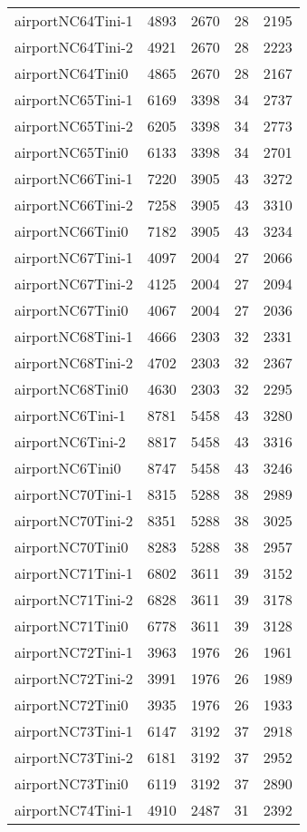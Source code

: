 \documentclass[../../../thesis.tex]{subfiles}
\begin{document}
\begin{longtable}{lrrrr}
airportNC64Tini-1 & 4893 & 2670 & 28 & 2195 \\
airportNC64Tini-2 & 4921 & 2670 & 28 & 2223 \\
airportNC64Tini0 & 4865 & 2670 & 28 & 2167 \\
airportNC65Tini-1 & 6169 & 3398 & 34 & 2737 \\
airportNC65Tini-2 & 6205 & 3398 & 34 & 2773 \\
airportNC65Tini0 & 6133 & 3398 & 34 & 2701 \\
airportNC66Tini-1 & 7220 & 3905 & 43 & 3272 \\
airportNC66Tini-2 & 7258 & 3905 & 43 & 3310 \\
airportNC66Tini0 & 7182 & 3905 & 43 & 3234 \\
airportNC67Tini-1 & 4097 & 2004 & 27 & 2066 \\
airportNC67Tini-2 & 4125 & 2004 & 27 & 2094 \\
airportNC67Tini0 & 4067 & 2004 & 27 & 2036 \\
airportNC68Tini-1 & 4666 & 2303 & 32 & 2331 \\
airportNC68Tini-2 & 4702 & 2303 & 32 & 2367 \\
airportNC68Tini0 & 4630 & 2303 & 32 & 2295 \\
airportNC6Tini-1 & 8781 & 5458 & 43 & 3280 \\
airportNC6Tini-2 & 8817 & 5458 & 43 & 3316 \\
airportNC6Tini0 & 8747 & 5458 & 43 & 3246 \\
airportNC70Tini-1 & 8315 & 5288 & 38 & 2989 \\
airportNC70Tini-2 & 8351 & 5288 & 38 & 3025 \\
airportNC70Tini0 & 8283 & 5288 & 38 & 2957 \\
airportNC71Tini-1 & 6802 & 3611 & 39 & 3152 \\
airportNC71Tini-2 & 6828 & 3611 & 39 & 3178 \\
airportNC71Tini0 & 6778 & 3611 & 39 & 3128 \\
airportNC72Tini-1 & 3963 & 1976 & 26 & 1961 \\
airportNC72Tini-2 & 3991 & 1976 & 26 & 1989 \\
airportNC72Tini0 & 3935 & 1976 & 26 & 1933 \\
airportNC73Tini-1 & 6147 & 3192 & 37 & 2918 \\
airportNC73Tini-2 & 6181 & 3192 & 37 & 2952 \\
airportNC73Tini0 & 6119 & 3192 & 37 & 2890 \\
airportNC74Tini-1 & 4910 & 2487 & 31 & 2392 \\

\end{longtable}
\end{document}
